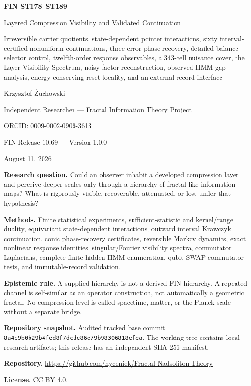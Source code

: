\documentclass[11pt,a4paper]{article}
\begin{document}
\begin{titlepage}
\centering
\vspace*{0.75cm}
{\LARGE\bfseries FIN ST178--ST189\par}
\vspace{0.25cm}
{\Large Layered Compression Visibility and Validated Continuation\par}
\vspace{0.35cm}
{\large Irreversible carrier quotients, state-dependent pointer interactions, sixty interval-certified nonuniform continuations, three-error phase recovery, detailed-balance selector control, twelfth-order response observables, a 343-cell nuisance cover, the Layer Visibility Spectrum, noisy factor reconstruction, observed-HMM gap analysis, energy-conserving reset locality, and an external-record interface\par}
\vspace{0.70cm}
{\Large Krzysztof \.{Z}uchowski\par}
\vspace{0.18cm}
{\large Independent Researcher --- Fractal Information Theory Project\par}
{\large ORCID: 0009-0002-0909-3613\par}
\vspace{0.50cm}
{\large FIN Release 10.69 --- Version 1.0.0\par}
{\large August 11, 2026\par}
\vfill
\begin{minipage}{0.92\textwidth}
\textbf{Research question.} Could an observer inhabit a developed compression layer and perceive deeper scales only through a hierarchy of fractal-like information maps? What is rigorously visible, recoverable, attenuated, or lost under that hypothesis?\par
\textbf{Methods.} Finite statistical experiments, sufficient-statistic and kernel/range duality, equivariant state-dependent interactions, outward interval Krawczyk continuation, conic phase-recovery certificates, reversible Markov dynamics, exact nonlinear response identities, singular/Fourier visibility spectra, commutator Laplacians, complete finite hidden-HMM enumeration, qubit-SWAP commutator tests, and immutable-record validation.\par
\textbf{Epistemic rule.} A supplied hierarchy is not a derived FIN hierarchy. A repeated channel is self-similar as an operator construction, not automatically a geometric fractal. No compression level is called spacetime, matter, or the Planck scale without a separate bridge.\par
\textbf{Repository snapshot.} Audited tracked base commit \texttt{8a4c9b0b29b4fed8f7dcdc86e79b98306818efea}. The working tree contains local research artifacts; this release has an independent SHA-256 manifest.\par
\textbf{Repository.} \url{https://github.com/hyconiek/Fractal-Nadsoliton-Theory}\par
\textbf{License.} CC BY 4.0.
\end{minipage}
\end{titlepage}
\end{document}
